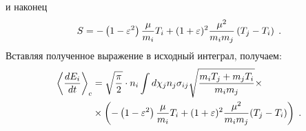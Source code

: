 и наконец
\begin{equation}
  S = -\left(1-\varepsilon^2\right)\frac{\mu}{m_i}T_i+(1+\varepsilon)^2\frac{\mu^2}{m_im_j}\left(T_j-T_i\right)\;.
\end{equation}
Вставляя полученное выражение в исходный интеграл, получаем:
\begin{equation}\label{eq:cooling_rate_interm}
  \begin{split}
    \left\langle\frac{dE_i}{dt}\right\rangle_c &= \sqrt{\frac{\pi}{2}}\cdot n_i\int d\chi_jn_j\sigma_{ij}
    \sqrt{\frac{m_iT_j+m_jT_i}{m_im_j}}\times \\
    &\times\left(-\left(1-\varepsilon^2\right)\frac{\mu}{m_i}T_i+(1+\varepsilon)^2\frac{\mu^2}{m_im_j}(T_j-T_i)\right)\;.    
  \end{split}
\end{equation}

